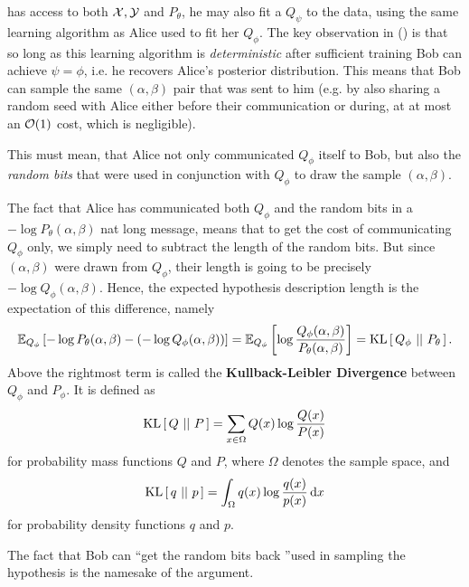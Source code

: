 has access to both $\X, \Y$ and $P_\theta$, he may also fit a $Q_\psi$ to the
data, using the same learning algorithm as Alice used to fit her $Q_\phi$. The
key observation in (\cite{hinton1993keeping}) is that so long as this learning
algorithm is \textit{deterministic} after sufficient training Bob can achieve
$\psi = \phi$, i.e. he recovers Alice's posterior distribution. This means that
Bob can sample the same $(\alpha, \beta)$ pair that was sent to him (e.g.
by also sharing a random seed with Alice either before their communication or
during, at at most an $\Oh(1)$ cost, which is negligible).
\begin{framed}
This must mean, that
Alice not only communicated $Q_\phi$ itself to Bob, but also the \textit{random
  bits} that were used in conjunction with $Q_\phi$ to draw the sample $(\alpha,
\beta)$.
\end{framed}
The fact that Alice has communicated both $Q_\phi$ and the random bits in a $-\log
P_\theta(\alpha, \beta)$ nat long message, means that to get the cost
of communicating $Q_\phi$ only, we simply need to subtract the length of the
random bits. But since $(\alpha, \beta)$ were drawn from $Q_\phi$, their length
is going to be precisely $-\log Q_\phi(\alpha, \beta)$. Hence, the expected
hypothesis description length is the expectation of this difference, namely
\[
  \Exp{-\log P_\theta (\alpha, \beta) - (-\log Q_\phi(\alpha, \beta))}{Q_\phi}
  =  \Exp{\log \frac{Q_\phi(\alpha, \beta)}{P_\theta (\alpha, \beta)}}{Q_\phi}
  = \KL{Q_\phi}{P_\theta}.
\]
Above the rightmost term is called the \textbf{Kullback-Leibler Divergence}
between $Q_\phi$ and $P_\phi$. It is defined as
\[
  \KL{Q}{P} = \sum_{x \in \Omega} Q(x)\log\frac{Q(x)}{P(x)}
\]
for probability mass functions $Q$ and $P$, where $\Omega$ denotes the sample
space, and
\[
  \KL{q}{p} = \int_\Omega q(x) \log\frac{q(x)}{p(x)} \d x
\]
for probability density functions $q$ and $p$.
\par
The fact that Bob can ``get the random bits back ''used in sampling the
hypothesis is the namesake of the argument.

